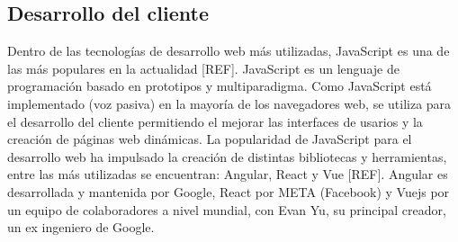 \subsection{Desarrollo del cliente}
Dentro de las tecnologías de desarrollo web más utilizadas, 
JavaScript es una de las más populares en la actualidad [REF]. JavaScript es 
un lenguaje de programación basado en prototipos y multiparadigma.
Como JavaScript está implementado (voz pasiva) en la mayoría de los 
navegadores web, se utiliza para el desarrollo del cliente permitiendo el 
mejorar las interfaces de usarios y la creación de
páginas web dinámicas.
La popularidad de JavaScript para el desarrollo web ha impulsado
la creación de distintas bibliotecas y herramientas, entre las más 
utilizadas se encuentran: Angular, React y Vue [REF]. Angular es desarrollada 
y mantenida por Google, React por META (Facebook) y Vuejs por un 
equipo de colaboradores a nivel mundial, con Evan Yu, su principal
creador, un ex ingeniero de Google. 






